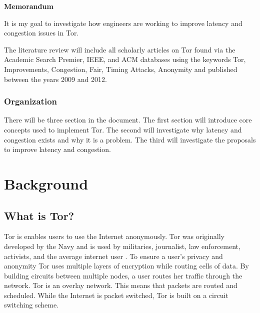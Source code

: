 \documentclass[letterpaper,13pt]{texMemo}
\begin{document}
\singlespace
\begin{center}
\large {\bf Memorandum}
\end{center}
\setlength{\topmargin}{0in}
\maketitle

It is my goal to investigate how engineers are working to improve latency and congestion issues in
Tor.

The literature review will include all scholarly articles on Tor found via the Academic Search
Premier, IEEE, and ACM databases using the keywords Tor, Improvements, Congestion, Fair, Timing
Attacks, Anonymity and published between the years 2009 and 2012.

\subsubsection*{Organization}
There will be three section in the document. The first section will introduce core concepts used to
implement Tor. The second will investigate why latency and congestion exists and why it is a
problem. The third will investigate the proposals to improve latency and congestion.

\section*{Background}

    \subsection*{What is Tor?}
    Tor is enables users to use the Internet anonymously. Tor was originally developed by the Navy
    and is used by militaries, journalist, law enforcement, activists, and the average internet user
    \citep[2]{Tor:web}. To ensure a user's privacy and anonymity Tor uses multiple layers of
    encryption while routing cells of data. By building circuits between multiple nodes, a user
    routes her traffic through the network. Tor is an overlay network. This means that packets are
    routed and scheduled. While the Internet is packet switched, Tor is built on a circuit switching
    scheme.
\end{document}
